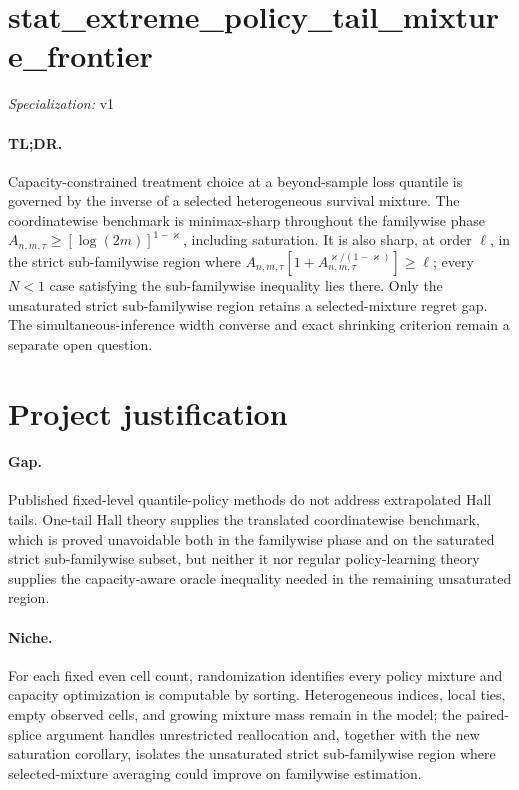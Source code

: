\documentclass{article}
\begin{document}
\sloppy

\section*{stat\_\allowbreak{}extreme\_\allowbreak{}policy\_\allowbreak{}tail\_\allowbreak{}mixture\_\allowbreak{}frontier}

\noindent\textit{Specialization:} v1\par

\paragraph{TL;DR.} Capacity-constrained treatment choice at a beyond-sample loss quantile is governed by the inverse of a selected heterogeneous survival mixture. The coordinatewise benchmark is minimax-sharp throughout the familywise phase \(A_{n,m,\tau}\ge[\log(2m)]^{1-\varkappa}\), including saturation. It is also sharp, at order \(\ell\), in the strict sub-familywise region where \(A_{n,m,\tau}[1+A_{n,m,\tau}^{\varkappa/(1-\varkappa)}]\ge\ell\); every \(N<1\) case satisfying the sub-familywise inequality lies there. Only the unsaturated strict sub-familywise region retains a selected-mixture regret gap. The simultaneous-inference width converse and exact shrinking criterion remain a separate open question.

\section{Project justification}

\paragraph{Gap.} Published fixed-level quantile-policy methods do not address extrapolated Hall tails. One-tail Hall theory supplies the translated coordinatewise benchmark, which is proved unavoidable both in the familywise phase and on the saturated strict sub-familywise subset, but neither it nor regular policy-learning theory supplies the capacity-aware oracle inequality needed in the remaining unsaturated region.

\paragraph{Niche.} For each fixed even cell count, randomization identifies every policy mixture and capacity optimization is computable by sorting. Heterogeneous indices, local ties, empty observed cells, and growing mixture mass remain in the model; the paired-splice argument handles unrestricted reallocation and, together with the new saturation corollary, isolates the unsaturated strict sub-familywise region where selected-mixture averaging could improve on familywise estimation.
\end{document}
